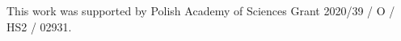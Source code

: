 \documentclass[
    hf
]{ceurart}
\begin{document}
\FloatBarrier

\begin{acknowledgments}
    This work was supported by Polish Academy of Sciences Grant 2020/39 / O / HS2 / 02931.
\end{acknowledgments}

%
\printbibliography
\appendix
\onecolumn
\end{document}
